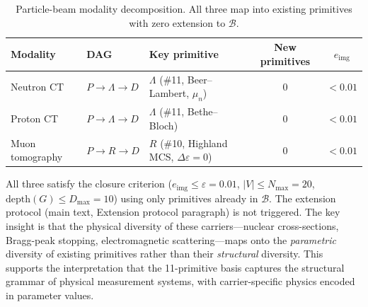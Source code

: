 \documentclass[11pt]{article}
\theoremstyle{definition}
\begin{document}
\begin{table}[ht]
\centering\small
\caption{Particle-beam modality decomposition. All three map into existing
primitives with zero extension to $\mathcal{B}$.}
\label{tab:particle_beam}
\begin{tabular}{@{}lllcc@{}}
\toprule
Modality & DAG & Key primitive & New primitives & $e_{\mathrm{img}}$ \\
\midrule
Neutron CT      & $P \to \Lambda \to D$ & $\Lambda$ (\#11, Beer--Lambert, $\mu_n$) & 0 & $<0.01$ \\
Proton CT       & $P \to \Lambda \to D$ & $\Lambda$ (\#11, Bethe--Bloch)           & 0 & $<0.01$ \\
Muon tomography & $P \to R \to D$       & $R$ (\#10, Highland MCS, $\Delta\varepsilon{=}0$) & 0 & $<0.01$ \\
\bottomrule
\end{tabular}
\end{table}

\noindent All three satisfy the closure criterion ($e_{\mathrm{img}} \leq
\varepsilon = 0.01$, $|V| \leq N_{\max} = 20$, $\mathrm{depth}(G) \leq
D_{\max} = 10$) using only primitives already in $\mathcal{B}$.  The
extension protocol (main text, Extension protocol paragraph) is not triggered.
The key insight is that the physical diversity of these carriers---nuclear
cross-sections, Bragg-peak stopping, electromagnetic scattering---maps onto
the \emph{parametric} diversity of existing primitives rather than their
\emph{structural} diversity.  This supports the interpretation that the
11-primitive basis captures the structural grammar of physical measurement
systems, with carrier-specific physics encoded in parameter values.



\end{document}
